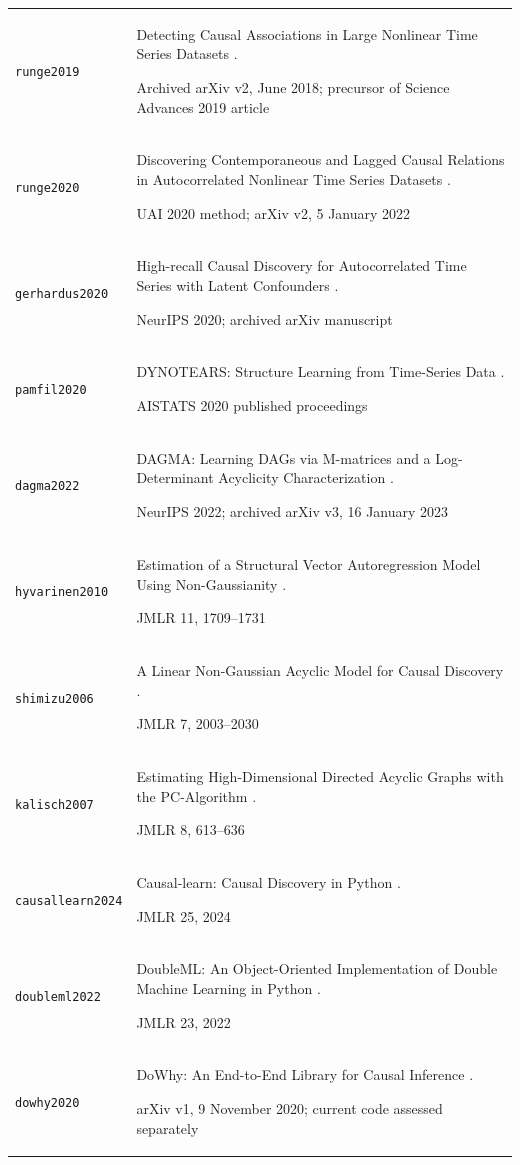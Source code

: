 \begin{longtable}{P{32mm}P{112mm}}
{\scriptsize\texttt{runge2019}} & Detecting Causal Associations in Large Nonlinear Time Series Datasets \citep{runge2019}.\par Archived arXiv v2, June 2018; precursor of Science Advances 2019 article\\
{\scriptsize\texttt{runge2020}} & Discovering Contemporaneous and Lagged Causal Relations in Autocorrelated Nonlinear Time Series Datasets \citep{runge2020}.\par UAI 2020 method; arXiv v2, 5 January 2022\\
{\scriptsize\texttt{gerhardus2020}} & High-recall Causal Discovery for Autocorrelated Time Series with Latent Confounders \citep{gerhardus2020}.\par NeurIPS 2020; archived arXiv manuscript\\
{\scriptsize\texttt{pamfil2020}} & DYNOTEARS: Structure Learning from Time-Series Data \citep{pamfil2020}.\par AISTATS 2020 published proceedings\\
{\scriptsize\texttt{dagma2022}} & DAGMA: Learning DAGs via M-matrices and a Log-Determinant Acyclicity Characterization \citep{dagma2022}.\par NeurIPS 2022; archived arXiv v3, 16 January 2023\\
{\scriptsize\texttt{hyvarinen2010}} & Estimation of a Structural Vector Autoregression Model Using Non-Gaussianity \citep{hyvarinen2010}.\par JMLR 11, 1709–1731\\
{\scriptsize\texttt{shimizu2006}} & A Linear Non-Gaussian Acyclic Model for Causal Discovery \citep{shimizu2006}.\par JMLR 7, 2003–2030\\
{\scriptsize\texttt{kalisch2007}} & Estimating High-Dimensional Directed Acyclic Graphs with the PC-Algorithm \citep{kalisch2007}.\par JMLR 8, 613–636\\
{\scriptsize\texttt{causallearn2024}} & Causal-learn: Causal Discovery in Python \citep{causallearn2024}.\par JMLR 25, 2024\\
{\scriptsize\texttt{doubleml2022}} & DoubleML: An Object-Oriented Implementation of Double Machine Learning in Python \citep{doubleml2022}.\par JMLR 23, 2022\\
{\scriptsize\texttt{dowhy2020}} & DoWhy: An End-to-End Library for Causal Inference \citep{dowhy2020}.\par arXiv v1, 9 November 2020; current code assessed separately\\

\end{longtable}
